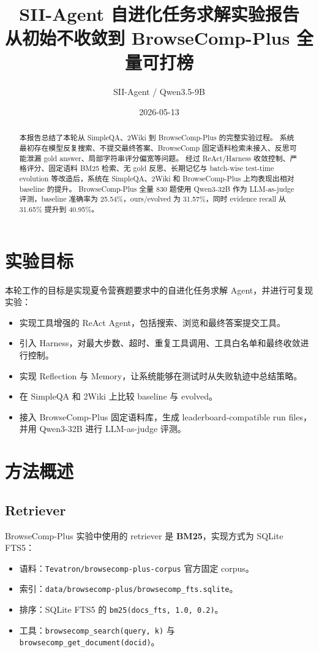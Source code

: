 \documentclass[UTF8,a4paper,11pt]{ctexart}
\title{\textbf{SII-Agent 自进化任务求解实验报告}\\
\large 从初始不收敛到 BrowseComp-Plus 全量可打榜}
\author{SII-Agent / Qwen3.5-9B}
\date{2026-05-13}
\begin{document}
\maketitle

\begin{abstract}
本报告总结了本轮从 SimpleQA、2Wiki 到 BrowseComp-Plus 的完整实验过程。
系统最初存在模型反复搜索、不提交最终答案、BrowseComp 固定语料检索未接入、反思可能泄漏 gold answer、局部字符串评分偏宽等问题。
经过 ReAct/Harness 收敛控制、严格评分、固定语料 BM25 检索、无 gold 反思、长期记忆与 batch-wise test-time evolution 等改造后，系统在 SimpleQA、2Wiki 和 BrowseComp-Plus 上均表现出相对 baseline 的提升。
BrowseComp-Plus 全量 830 题使用 Qwen3-32B 作为 LLM-as-judge 评测，baseline 准确率为 25.54\%，ours/evolved 为 31.57\%，同时 evidence recall 从 31.65\% 提升到 40.95\%。
\end{abstract}

\section{实验目标}

本轮工作的目标是实现夏令营赛题要求中的自进化任务求解 Agent，并进行可复现实验：

\begin{itemize}
  \item 实现工具增强的 ReAct Agent，包括搜索、浏览和最终答案提交工具。
  \item 引入 Harness，对最大步数、超时、重复工具调用、工具白名单和最终收敛进行控制。
  \item 实现 Reflection 与 Memory，让系统能够在测试时从失败轨迹中总结策略。
  \item 在 SimpleQA 和 2Wiki 上比较 baseline 与 evolved。
  \item 接入 BrowseComp-Plus 固定语料库，生成 leaderboard-compatible run files，并用 Qwen3-32B 进行 LLM-as-judge 评测。
\end{itemize}

\section{方法概述}

\subsection{Retriever}

BrowseComp-Plus 实验中使用的 retriever 是 \textbf{BM25}，实现方式为 SQLite FTS5：

\begin{itemize}
  \item 语料：\texttt{Tevatron/browsecomp-plus-corpus} 官方固定 corpus。
  \item 索引：\texttt{data/browsecomp-plus/browsecomp\_fts.sqlite}。
  \item 排序：SQLite FTS5 的 \texttt{bm25(docs\_fts, 1.0, 0.2)}。
  \item 工具：\texttt{browsecomp\_search(query, k)} 与 \texttt{browsecomp\_get\_document(docid)}。
\end{itemize}
\end{document}
